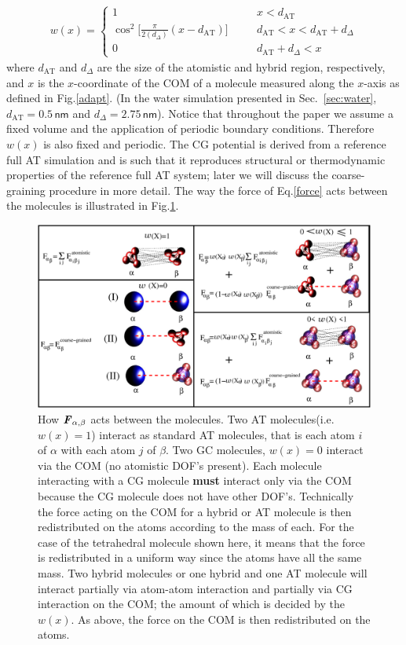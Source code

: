 \documentclass[aps,prb,preprint,citeautoscript]{revtex4}
\newcommand{\redc}[1]{{\color{red} #1}}
\renewcommand{\v}[1]{\textbf{\textit{#1}}}
\begin{document}
\begin{align}\label{eqn:old-w}
  w(x) =
  \left\{
    \begin{array}{lcl}
      1 &\quad& x < d_{\textrm{AT}}\\
      \cos^2\big[\frac{\pi}{2(d_{{\Delta}})} (x - d_{\textrm{AT}})\big] && d_{\textrm{AT}}  < x < d_{\textrm{AT}} + d_{{\Delta}} \\
      0 && d_{\textrm{AT}} + d_{{\Delta}}  < x
    \end{array}
  \right.
\end{align}
where $d_{\textrm{AT}}$ and $d_{{\Delta}}$ are the size of the
atomistic and hybrid region, respectively, and $x$ is the $x$-coordinate of the COM of a molecule measured along the $x$-axis as defined in Fig.\ref{adapt}.
\redc{(In the water simulation presented in Sec.~\ref{sec:water}, $d_{\textrm{AT}} = 0.5\, \textsf{nm}$ and $d_{\Delta} = 2.75\, \textsf{nm}$).}
\redc{Notice that throughout the paper we assume a fixed volume and the application of periodic boundary conditions. Therefore $w(x)$ is also fixed and periodic.}
The CG potential is derived from a reference full AT simulation and is such that it reproduces structural or thermodynamic properties of the reference full AT system; later we will discuss the coarse-graining procedure in more detail. The way the force of Eq.\ref{force} acts between the molecules is illustrated in Fig.\ref{inter}. 
\begin{figure}
  \centering
  \includegraphics[angle=0,width=17cm]{force.eps}
  \caption{How ${\v F}_{\alpha,\beta}$ acts between the molecules. Two AT molecules(i.e. $w(x)=1$)  interact as standard AT molecules, that is each atom $i$ of $\alpha$ with each atom $j$ of $\beta$. Two GC molecules, $w(x)=0$ interact via the COM (no atomistic DOF's present). Each molecule interacting with a CG molecule {\bf must} interact only via the COM because the CG molecule does not have other DOF's. Technically the force acting on the COM for a hybrid or AT molecule is then redistributed on the atoms according to the mass of each. For the case of the tetrahedral molecule shown here, it means that the force is redistributed in a uniform way since the atoms have all the same mass. Two hybrid molecules or one hybrid and one AT molecule will interact partially via atom-atom interaction and partially via CG interaction on the COM; the amount of which is decided by the $w(x)$. As above, the force on the COM is then redistributed on the atoms.}
  \label{inter}
\end{figure} 
\end{document}
